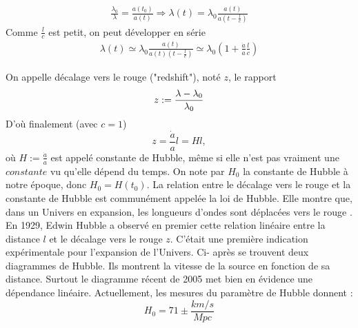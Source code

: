 \documentclass[a4paper,12pt]{report}
\theoremstyle{plain}
\theoremstyle{plain}
\begin{document}
      	\begin{eqnarray}
      	\frac{\lambda_0}{\lambda}=\frac{a\left( t_0\right) }{a\left(t \right) }\Rightarrow \lambda\left( t\right) =\lambda_0 \frac{a\left( t\right) }{a\left( t-\frac{l}{c}\right) }
      	\end{eqnarray}
      	Comme $\frac{l}{c}$ est petit, on peut d\'evelopper en s\'erie 
      	\begin{eqnarray}
      	\lambda\left( t\right) \simeq\lambda_0 \frac{a\left( t\right) }{a\left( t\right) \left( t-\frac{l}{c}\right) } \simeq \lambda_0\left(1+\frac{\dot{a}}{a} \frac{l}{c} \right) 
      	\end{eqnarray}
      	
      	On appelle d\'ecalage vers le rouge ("redshift"), not\'e $z$, le rapport 
      	\begin{equation}
      	z:= \frac{\lambda- \lambda_0}{\lambda_0} \\
      	\end{equation}
      	D'o\`{u} finalement (avec $c=1$)
      	\begin{equation}
      	z=\frac{\dot{a}}{a}l= Hl,
      	\end{equation}
      	o\`{u} $H:=\frac{\dot{a}}{a}$ est appel\'e constante de Hubble, m\^{e}me si elle n'est  pas vraiment une $constante $ vu qu'elle d\'epend du temps. On note par $H_0$ la constante de Hubble \`a notre \'epoque, donc $H_0=H\left(t_0 \right) $. La relation entre le d\'ecalage vers le rouge et la constante de Hubble est commun\'ement appel\'ee la loi de Hubble. Elle montre que, dans un Univers en expansion, les longueurs d'ondes sont d\'eplac\'ees vers le rouge . En 1929, Edwin Hubble a observ\'e en premier cette relation lin\'eaire entre la distance $l$ et le d\'ecalage vers le rouge $z$. C'\'etait une premi\`ere indication exp\'erimentale pour l'expansion de l'Univers. Ci- apr\`es se trouvent deux diagrammes de Hubble. Ils montrent la vitesse de la source en fonction de sa distance. Surtout le diagramme r\'ecent de 2005 met bien en \'evidence une d\'ependance lin\'eaire. Actuellement, les mesures du param\`etre de Hubble donnent  :
      	\begin{equation}
      	H_0= 71 \pm \frac{km/s}{Mpc}
      	\end{equation}
      	
      	
\end{document}
